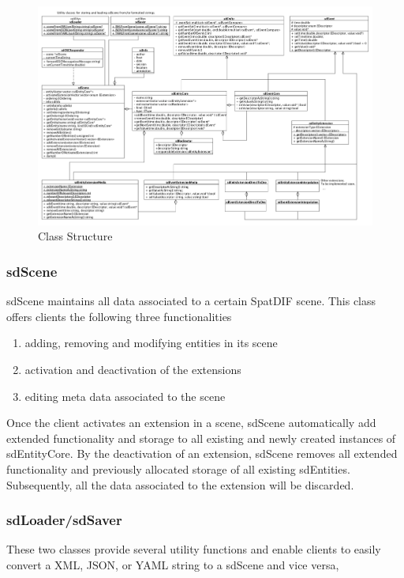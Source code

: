 \documentclass[a4paper]{article}
\begin{document}
\begin{figure}[t]
\centerline{
	\includegraphics[width= 17.5cm]{classes.pdf}}
\caption{Class Structure}
\label{fig:class_structure}
\end{figure}

\subsubsection{sdScene}
sdScene maintains all data associated to a certain SpatDIF scene. This class offers clients the following three functionalities

\begin{enumerate}
\item adding, removing and modifying entities in its scene
\item activation and deactivation of the extensions
\item editing meta data associated to the scene
\end{enumerate}

Once the client activates an extension in a scene, sdScene automatically add extended functionality and storage to all existing and newly created instances of sdEntityCore. By the deactivation of an extension, sdScene removes all extended functionality and previously allocated storage of all existing sdEntities. Subsequently, all the data associated to the extension will be discarded. 

\subsubsection{sdLoader/sdSaver}
These two classes provide several utility functions and enable clients to easily convert a XML, JSON, or YAML string to a sdScene and vice versa,
\end{document}
